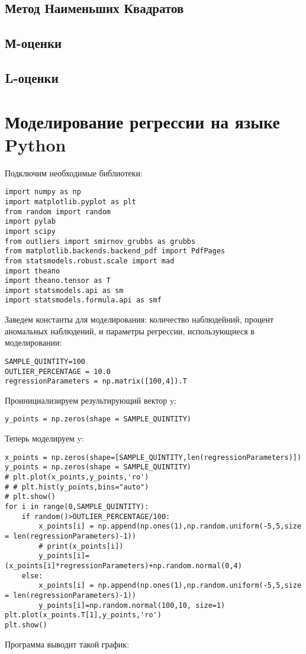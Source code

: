 \documentclass[12pt]{article}
\begin{document}
\subsection{Метод Наименьших Квадратов}
\subsection{М-оценки}
\subsection{L-оценки}


\section{Моделирование регрессии на языке Python}
Подключим необходимые библиотеки:\hfill\break
\begin{verbatim}
import numpy as np
import matplotlib.pyplot as plt
from random import random
import pylab
import scipy
from outliers import smirnov_grubbs as grubbs
from matplotlib.backends.backend_pdf import PdfPages
from statsmodels.robust.scale import mad
import theano
import theano.tensor as T
import statsmodels.api as sm
import statsmodels.formula.api as smf
\end{verbatim}
Заведем константы для моделирования: количество наблюдейний, процент аномальных наблюдений, и параметры регрессии, использующиеся в моделировании:
\begin{verbatim}
SAMPLE_QUINTITY=100
OUTLIER_PERCENTAGE = 10.0
regressionParameters = np.matrix([100,4]).T
\end{verbatim}
Проинициализируем результирующий вектор y:
\begin{verbatim}
y_points = np.zeros(shape = SAMPLE_QUINTITY)
\end{verbatim}
Теперь моделируем y:
\begin{verbatim}
x_points = np.zeros(shape=[SAMPLE_QUINTITY,len(regressionParameters)])
y_points = np.zeros(shape = SAMPLE_QUINTITY)
# plt.plot(x_points,y_points,'ro')
# # plt.hist(y_points,bins="auto")
# plt.show()
for i in range(0,SAMPLE_QUINTITY):
    if random()>OUTLIER_PERCENTAGE/100:
        x_points[i] = np.append(np.ones(1),np.random.uniform(-5,5,size = len(regressionParameters)-1))
        # print(x_points[i])
        y_points[i]=(x_points[i]*regressionParameters)+np.random.normal(0,4)
    else:
        x_points[i] = np.append(np.ones(1),np.random.uniform(-5,5,size = len(regressionParameters)-1))
        y_points[i]=np.random.normal(100,10, size=1)
plt.plot(x_points.T[1],y_points,'ro')
plt.show()
\end{verbatim}
Программа выводит такой график:

\newpage
\tableofcontents
\end{document}

